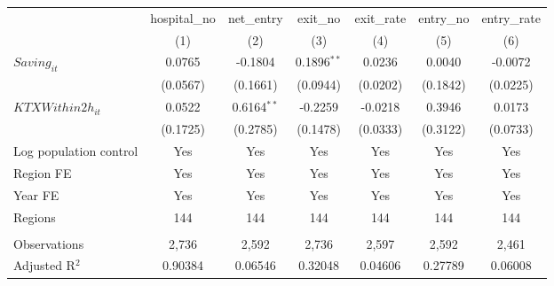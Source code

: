\begingroup
\centering
\begin{tabular}{lcccccc}
   \toprule
                          & hospital\_no  & net\_entry    & exit\_no      & exit\_rate  & entry\_no  & entry\_rate \\    
                          & (1)           & (2)           & (3)           & (4)         & (5)        & (6)\\  
   \midrule 
   $Saving_{it}$          & 0.0765        & -0.1804       & 0.1896$^{**}$ & 0.0236      & 0.0040     & -0.0072\\   
                          & (0.0567)      & (0.1661)      & (0.0944)      & (0.0202)    & (0.1842)   & (0.0225)\\   
   $KTXWithin2h_{it}$     & 0.0522        & 0.6164$^{**}$ & -0.2259       & -0.0218     & 0.3946     & 0.0173\\   
                          & (0.1725)      & (0.2785)      & (0.1478)      & (0.0333)    & (0.3122)   & (0.0733)\\   
   Log population control & Yes           & Yes           & Yes           & Yes         & Yes        & Yes\\  
   Region FE              & Yes           & Yes           & Yes           & Yes         & Yes        & Yes\\  
   Year FE                & Yes           & Yes           & Yes           & Yes         & Yes        & Yes\\  
   Regions                & 144           & 144           & 144           & 144         & 144        & 144\\  
    \\
   Observations           & 2,736         & 2,592         & 2,736         & 2,597       & 2,592      & 2,461\\  
   Adjusted R$^2$         & 0.90384       & 0.06546       & 0.32048       & 0.04606     & 0.27789    & 0.06008\\  
   \bottomrule
\end{tabular}
\par\endgroup
